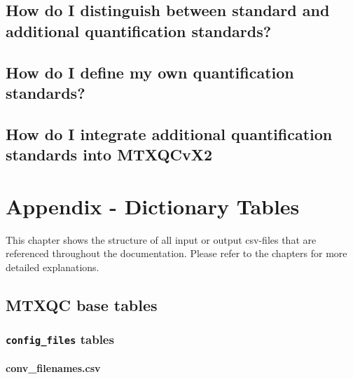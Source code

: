 \documentclass[]{book}
\begin{document}
\hypertarget{quantquant}{%
\section{How do I distinguish between standard and additional quantification standards?}\label{quantquant}}

\hypertarget{quantind}{%
\section{How do I define my own quantification standards?}\label{quantind}}

\hypertarget{addqadds}{%
\section{How do I integrate additional quantification standards into MTXQCvX2}\label{addqadds}}

\hypertarget{tables}{%
\chapter{Appendix - Dictionary Tables}\label{tables}}

This chapter shows the structure of all input or output csv-files that are referenced throughout the documentation. Please refer to the chapters for more detailed explanations.

\hypertarget{mtxqc-base-tables}{%
\section{MTXQC base tables}\label{mtxqc-base-tables}}

\hypertarget{config_files-tables}{%
\subsection{\texorpdfstring{\texttt{config\_files} tables}{config\_files tables}}\label{config_files-tables}}

\hypertarget{filenames}{%
\subsubsection{conv\_filenames.csv}\label{filenames}}
\end{document}
